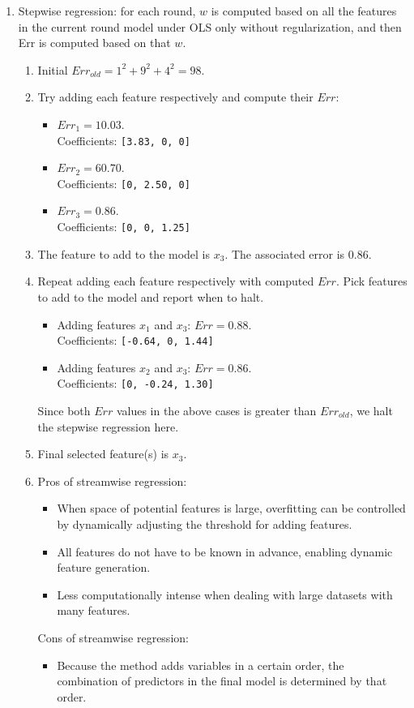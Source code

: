\begin{enumerate}
    \item Stepwise regression: for each round, $w$ is computed based on all the features in the current round model under OLS only without regularization, and then Err is computed based on that $w$.
    \begin{enumerate}
        \item Initial $Err_{old} = 1^2 + 9^2 + 4^2 = 98$.
        \item Try adding each feature respectively and compute their $Err$:
        \begin{itemize}
        	\item $Err_1 = 10.03$. \\
        	Coefficients: \verb|[3.83, 0, 0]|
        	\item $Err_2 = 60.70$. \\
			Coefficients: \verb|[0, 2.50, 0]|
        	\item $Err_3 = 0.86$. \\
			Coefficients: \verb|[0, 0, 1.25]|        	
        \end{itemize}
        \item The feature to add to the model is $x_3$. The associated error is $0.86$.
        \item Repeat adding each feature respectively with computed $Err$. Pick features to add to the model and report when to halt.
        \begin{itemize}
        	\item Adding features $x_1$ and $x_3$: $Err = 0.88$. \\
			Coefficients: \verb|[-0.64, 0, 1.44]|        	
        	\item Adding features $x_2$ and $x_3$: $Err = 0.86$. \\
			Coefficients: \verb|[0, -0.24, 1.30]|        				
        \end{itemize}
    Since both $Err$ values in the above cases is greater than $Err_{old}$, we halt the stepwise regression here.
        \item Final selected feature(s) is $x_3$. 
        \item Pros of streamwise regression:
        \begin{itemize}
        	\item When space of potential features is large, overfitting can be controlled by dynamically adjusting the threshold for adding features.
        	\item All features do not have to be known in advance, enabling dynamic feature generation.
        	\item Less computationally intense when dealing with large datasets with many features.
        \end{itemize}
    	Cons of streamwise regression:
    	\begin{itemize}
    		\item Because the method adds variables in a certain order, the combination of predictors in the final model is determined by that order.
    	\end{itemize}
    \end{enumerate}   
\end{enumerate}